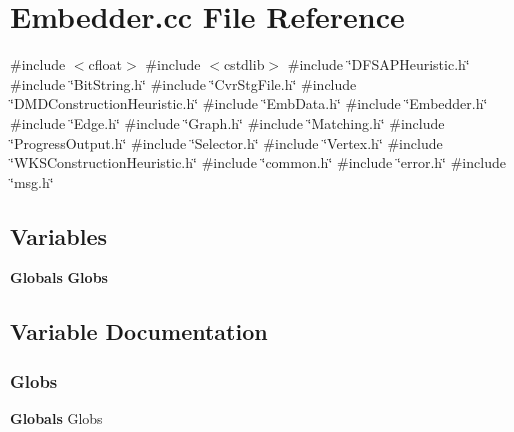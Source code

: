 \section{Embedder.\+cc File Reference}
\label{Embedder_8cc}
{\ttfamily \#include $<$cfloat$>$}\newline
{\ttfamily \#include $<$cstdlib$>$}\newline
{\ttfamily \#include \char`\"{}D\+F\+S\+A\+P\+Heuristic.\+h\char`\"{}}\newline
{\ttfamily \#include \char`\"{}Bit\+String.\+h\char`\"{}}\newline
{\ttfamily \#include \char`\"{}Cvr\+Stg\+File.\+h\char`\"{}}\newline
{\ttfamily \#include \char`\"{}D\+M\+D\+Construction\+Heuristic.\+h\char`\"{}}\newline
{\ttfamily \#include \char`\"{}Emb\+Data.\+h\char`\"{}}\newline
{\ttfamily \#include \char`\"{}Embedder.\+h\char`\"{}}\newline
{\ttfamily \#include \char`\"{}Edge.\+h\char`\"{}}\newline
{\ttfamily \#include \char`\"{}Graph.\+h\char`\"{}}\newline
{\ttfamily \#include \char`\"{}Matching.\+h\char`\"{}}\newline
{\ttfamily \#include \char`\"{}Progress\+Output.\+h\char`\"{}}\newline
{\ttfamily \#include \char`\"{}Selector.\+h\char`\"{}}\newline
{\ttfamily \#include \char`\"{}Vertex.\+h\char`\"{}}\newline
{\ttfamily \#include \char`\"{}W\+K\+S\+Construction\+Heuristic.\+h\char`\"{}}\newline
{\ttfamily \#include \char`\"{}common.\+h\char`\"{}}\newline
{\ttfamily \#include \char`\"{}error.\+h\char`\"{}}\newline
{\ttfamily \#include \char`\"{}msg.\+h\char`\"{}}\newline
\subsection*{Variables}
\begin{DoxyCompactItemize}
\item 
\textbf{ Globals} \textbf{ Globs}
\end{DoxyCompactItemize}


\subsection{Variable Documentation}
\mbox{\label{Embedder_8cc_a2a123bbda4503ceb387f31a384139bec}} 
\subsubsection{Globs}
{\footnotesize\ttfamily \textbf{ Globals} Globs}

